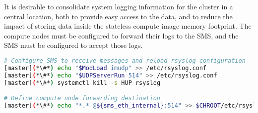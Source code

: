 It is desirable to consolidate system logging information for the cluster in a
central location, both to provide easy access to the data, and to reduce the
impact of storing data inside the stateless compute image memory footprint. The
compute nodes must be configured to forward their logs to the SMS, and the SMS
must be configured to accept those logs.

\begin{lstlisting}[language=bash,keywords={}]
# Configure SMS to receive messages and reload rsyslog configuration
[master](*\#*) echo "$ModLoad imudp" >> /etc/rsyslog.conf
[master](*\#*) echo "$UDPServerRun 514" >> /etc/rsyslog.conf
[master](*\#*) systemctl kill -s HUP rsyslog

# Define compute node forwarding destination
[master](*\#*) echo "*.* @${sms_eth_internal}:514" >> $CHROOT/etc/rsyslog.conf
\end{lstlisting}

